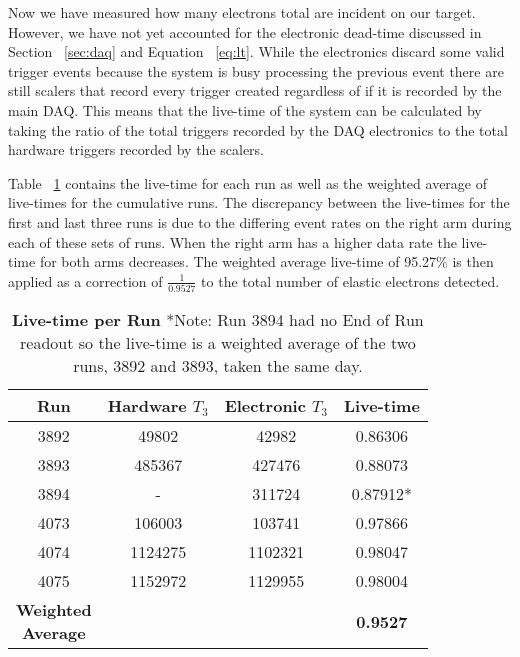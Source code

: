 Now we have measured how many electrons total are incident on our target. However, we have not yet accounted for the electronic dead-time discussed in Section ~\ref{sec:daq} and Equation ~\ref{eq:lt}. While the electronics discard some valid trigger events because the system is busy processing the previous event there are still scalers that record every trigger created regardless of if it is recorded by the main DAQ. This means that the live-time of the system can be calculated by taking the ratio of the total triggers recorded by the DAQ electronics to the total hardware triggers recorded by the scalers. 

Table ~\ref{tab:live-time} contains the live-time for each run as well as the weighted average of live-times for the cumulative runs. The discrepancy between the live-times for the first and last three runs is due to the differing event rates on the right arm during each of these sets of runs. When the right arm has a higher data rate the live-time for both arms decreases. The weighted average live-time of 95.27$\%$ is then applied as a correction of $\frac{1}{0.9527}$ to the total number of elastic electrons detected.


\begin{table}[!h]
\centering
\begin{tabular}{|c c c c|}
\hline
\textbf{Run} & \makecell{\textbf{Hardware}\\ \textbf{$T_3$}} & \makecell{\textbf{Electronic}\\ \textbf{$T_3$}} & \textbf{Live-time}\\
\hline
3892 & 49802 & 42982 & 0.86306 \\
3893 & 485367 & 427476 & 0.88073 \\
3894 & - & 311724 & 0.87912* \\
4073 & 106003 & 103741 & 0.97866 \\
4074 & 1124275 & 1102321 & 0.98047 \\
4075 & 1152972 & 1129955 & 0.98004 \\  
\hline
\makecell{\textbf{Weighted}\\ \textbf{Average}} &  &  & \textbf{0.9527} \\
\hline
\end{tabular}
\caption{{\bf{Live-time per Run}} *Note: Run 3894 had no End of Run readout so the live-time is a weighted average of the two runs, 3892 and 3893, taken the same day.}
\label{tab:live-time}
\end{table}

